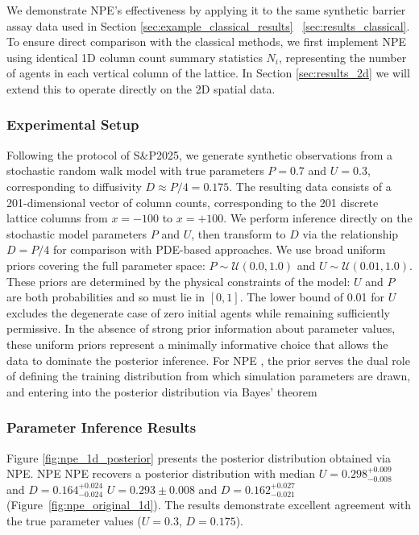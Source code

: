 \documentclass{article}
\newcommand{\SP}{S\&P2025}
\providecommand{\DIFaddtex}[1]{{\protect\color{blue} \sf #1}} %
\providecommand{\DIFdeltex}[1]{{\protect\color{red} \scriptsize #1}} %
\providecommand{\DIFaddbegin}{} %
\providecommand{\DIFaddend}{} %
\providecommand{\DIFdelbegin}{} %
\providecommand{\DIFdelend}{} %
\providecommand{\DIFadd}[1]{\texorpdfstring{\DIFaddtex{#1}}{#1}} %
\providecommand{\DIFdel}[1]{\texorpdfstring{\DIFdeltex{#1}}{}} %
\newcommand{\DIFscaledelfig}{0.5}
\newlength{\DIFdelgraphicswidth} %
\newlength{\DIFdelgraphicsheight} %
\newcommand{\DIFaddincludegraphics}[2][]{{\color{blue}\fbox{\DIFOincludegraphics[#1]{#2}}}} %
\newcommand{\DIFdelincludegraphics}[2][]{%
\sbox{\DIFdelgraphicsbox}{\DIFOincludegraphics[#1]{#2}}%
\settoboxwidth{\DIFdelgraphicswidth}{\DIFdelgraphicsbox} %
\settoboxtotalheight{\DIFdelgraphicsheight}{\DIFdelgraphicsbox} %
\scalebox{\DIFscaledelfig}{%
\parbox[b]{\DIFdelgraphicswidth}{\usebox{\DIFdelgraphicsbox}\\[-\baselineskip] \rule{\DIFdelgraphicswidth}{0em}}\llap{\resizebox{\DIFdelgraphicswidth}{\DIFdelgraphicsheight}{%
\setlength{\unitlength}{\DIFdelgraphicswidth}%
\begin{picture}(1,1)%
\thicklines\linethickness{2pt} %
{\color[rgb]{1,0,0}\put(0,0){\framebox(1,1){}}}%
{\color[rgb]{1,0,0}\put(0,0){\line( 1,1){1}}}%
{\color[rgb]{1,0,0}\put(0,1){\line(1,-1){1}}}%
\end{picture}%
}\hspace*{3pt}}} %
} %
\DeclareRobustCommand{\DIFaddbegin}{\DIFOaddbegin \let\includegraphics\DIFaddincludegraphics} %
\DeclareRobustCommand{\DIFaddend}{\DIFOaddend \let\includegraphics\DIFOincludegraphics} %
\DeclareRobustCommand{\DIFdelbegin}{\DIFOdelbegin \let\includegraphics\DIFdelincludegraphics} %
\DeclareRobustCommand{\DIFdelend}{\DIFOaddend \let\includegraphics\DIFOincludegraphics} %
\begin{document}
We demonstrate NPE's effectiveness by applying it to the same synthetic barrier assay data used in Section\DIFdelbegin \DIFdel{\ref{sec:example_classical_results}}\DIFdelend \DIFaddbegin \DIFadd{~\ref{sec:results_classical}}\DIFaddend . To ensure direct comparison with the classical methods, we first implement NPE using identical 1D column count summary statistics $N_i$, representing the number of agents in each vertical column of the lattice. \DIFdelbegin \DIFdel{In Section \ref{sec:results_2d} we will extend this to operate directly on the 2D spatial data.
}%

\subsubsection{\DIFdel{Experimental Setup}}
\addtocounter{subsubsection}{-1}%
\DIFdelend Following the protocol of \SP, we generate synthetic observations from a stochastic random walk model with true parameters $P = 0.7$ and $U = 0.3$, corresponding to diffusivity $D \approx P/4 = 0.175$. The resulting data consists of a 201-dimensional vector of column counts, corresponding to the 201 discrete lattice columns from $x=-100$ to $x=+100$. We perform inference directly on the stochastic model parameters $P$ and $U$, then transform to $D$ via the relationship $D = P/4$ for comparison with PDE-based approaches. \DIFdelbegin \DIFdel{We use  broad uniform priors covering the full parameter space: $P \sim \mathcal{U}(0.0, 1.0)$ and $U \sim \mathcal{U}(0.01, 1.0)$. These priors are determined by the physical constraints of the model: $U$ and $P$ are both probabilities and so must lie in $[0,1]$. The lower bound of 0.01 for $U$ excludes the degenerate case of zero initial agents while remaining sufficiently permissive. In the absence of strong prior information about parameter values, these uniform priors represent a minimally informative choice that allows the data to dominate the posterior inference. For NPE , the prior serves the dual role of defining the training distribution from which simulation parameters are drawn, and entering into the posterior distribution via Bayes' theorem \citep{Gelman1995,Gelman2017}
}%

\subsubsection{\DIFdel{Parameter Inference Results}}
\addtocounter{subsubsection}{-1}%
\DIFdel{Figure \ref{fig:npe_1d_posterior} presents the posterior distribution obtained via NPE. NPE }\DIFdelend \DIFaddbegin \DIFadd{NPE }\DIFaddend recovers a posterior distribution with median \DIFdelbegin \DIFdel{$U = 0.298^{+0.009}_{-0.008}$ and $D=0.164^{+0.024}_{-0.024}$}\DIFdelend \DIFaddbegin \DIFadd{$U = 0.293 \pm 0.008$ and $D=0.162^{+0.027}_{-0.021}$ (Figure~\ref{fig:npe_original_1d})}\DIFaddend . The results demonstrate excellent agreement with the true parameter values ($U = 0.3$, $D = 0.175$).
\end{document}
